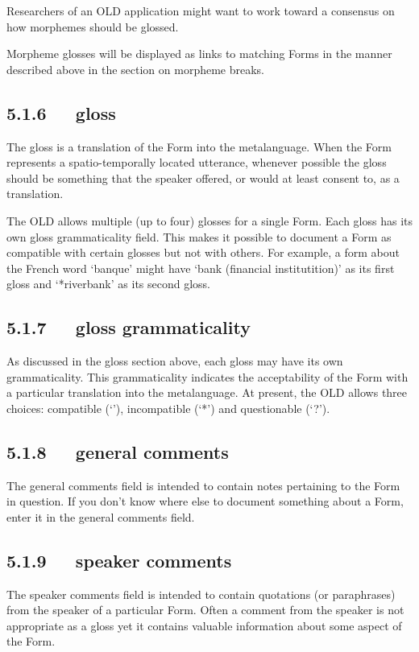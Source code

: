 \documentclass[letterpaper,10pt,english]{sphinxmanual}
\begin{document}
Researchers of an OLD application might want to work toward a consensus on how
morphemes should be glossed.

Morpheme glosses will be displayed as links to matching Forms in the manner
described above in the section on morpheme breaks.


\subsection{5.1.6   gloss}
\label{documentation:gloss}
The gloss is a translation of the Form into the metalanguage.  When the Form
represents a spatio-temporally located utterance, whenever possible the gloss
should be something that the speaker offered, or would at least consent to, as a
translation.

The OLD allows multiple (up to four) glosses for a single Form.  Each gloss has
its own gloss grammaticality field.  This makes it possible to document a Form
as compatible with certain glosses but not with others.  For example, a form
about the French word `banque' might have `bank (financial institutition)' as
its first gloss and `*riverbank' as its second gloss.


\subsection{5.1.7   gloss grammaticality}
\label{documentation:gloss-grammaticality}
As discussed in the gloss section above, each gloss may have its own
grammaticality.  This grammaticality indicates the acceptability of the Form
with a particular translation into the metalanguage.  At present, the OLD allows
three choices: compatible (`'), incompatible (`*') and questionable (`?').


\subsection{5.1.8   general comments}
\label{documentation:general-comments}
The general comments field is intended to contain notes pertaining to the Form
in question.  If you don't know where else to document something about a Form,
enter it in the general comments field.


\subsection{5.1.9   speaker comments}
\label{documentation:speaker-comments}
The speaker comments field is intended to contain quotations (or paraphrases)
from the speaker of a particular Form.  Often a comment from the speaker is
not appropriate as a gloss yet it contains valuable information about some
aspect of the Form.
\end{document}
